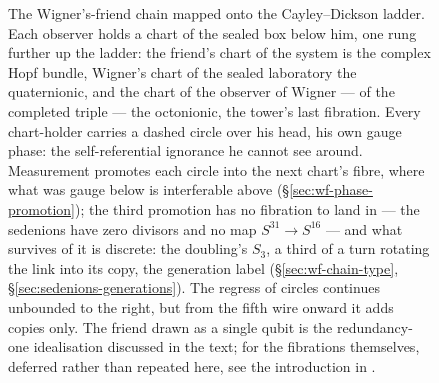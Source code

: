 \begin{figure}[t]
{%
}
\caption{The Wigner's-friend chain mapped onto the Cayley--Dickson ladder. Each
observer holds a chart of the sealed box below him, one rung further up the
ladder: the friend's chart of the system is the complex Hopf bundle, Wigner's
chart of the sealed laboratory the quaternionic, and the chart of the observer
of Wigner --- of the completed triple --- the octonionic, the tower's last
fibration. Every chart-holder carries a dashed circle over his head, his own
gauge phase: the self-referential ignorance he cannot see around. Measurement
promotes each circle into the next chart's fibre, where what was gauge below is
interferable above (\S\ref{sec:wf-phase-promotion}); the third promotion has no
fibration to land in --- the sedenions have zero divisors and no map
$S^{31}\to S^{16}$ --- and what survives of it is discrete: the doubling's
$S_{3}$, a third of a turn rotating the link into its copy, the generation
label (\S\ref{sec:wf-chain-type}, \S\ref{sec:sedenions-generations}). The
regress of circles continues unbounded to the right, but from the fifth wire
onward it adds copies only. The friend drawn as a single qubit is the
redundancy-one idealisation discussed in the text; for the fibrations
themselves, deferred rather than repeated here, see the introduction in
\autocite{szangolies2025standardmodel}.}
\label{fig:wf-hopf-ladder}
\end{figure}
